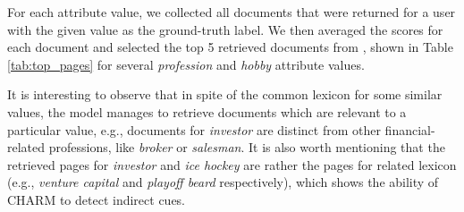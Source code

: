 

For each attribute value, we collected all documents that were returned for a user with the given value as the ground-truth label. We then averaged the scores for each document and selected the top 5 retrieved documents from ,
shown in Table \ref{tab:top_pages} for several \emph{profession} and \emph{hobby} attribute values.

It is interesting to observe that in spite of the common lexicon for some similar values, the model manages to retrieve documents which are relevant to a particular value, e.g., documents for \textit{investor}  are distinct from other financial-related professions, like \textit{broker} or \textit{salesman}.
It is also worth mentioning that the retrieved pages for \textit{investor} and \textit{ice hockey} are rather the pages for related lexicon (e.g., \textit{venture capital} and \textit{playoff beard} respectively), which shows the ability of CHARM to detect indirect cues.


